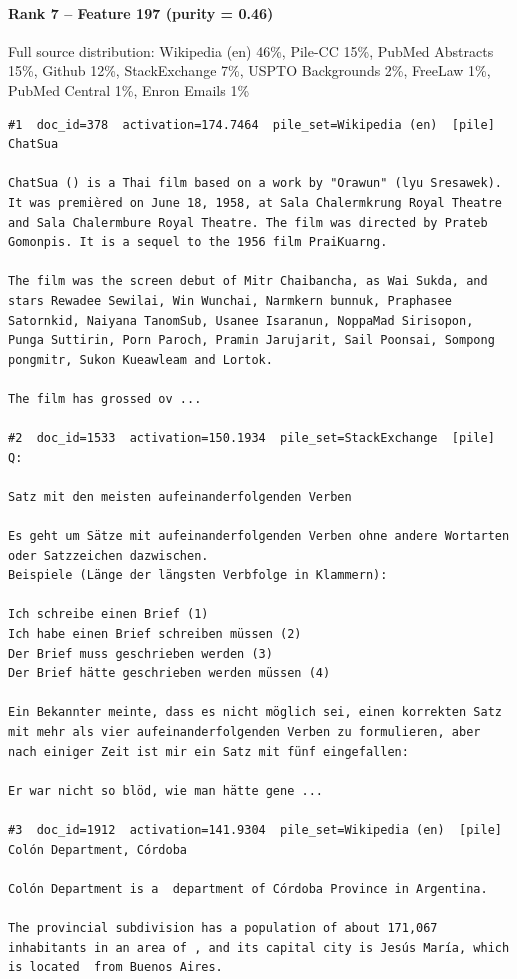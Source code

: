 \paragraph*{Rank 7 -- Feature 197 (purity = 0.46)}

Full source distribution: Wikipedia (en) 46\%, Pile-CC 15\%, PubMed Abstracts 15\%, Github 12\%, StackExchange 7\%, USPTO Backgrounds 2\%, FreeLaw 1\%, PubMed Central 1\%, Enron Emails 1\%

\begin{verbatim}
#1  doc_id=378  activation=174.7464  pile_set=Wikipedia (en)  [pile]
ChatSua

ChatSua () is a Thai film based on a work by "Orawun" (lyu Sresawek). It was premièred on June 18, 1958, at Sala Chalermkrung Royal Theatre and Sala Chalermbure Royal Theatre. The film was directed by Prateb Gomonpis. It is a sequel to the 1956 film PraiKuarng.

The film was the screen debut of Mitr Chaibancha, as Wai Sukda, and stars Rewadee Sewilai, Win Wunchai, Narmkern bunnuk, Praphasee Satornkid, Naiyana TanomSub, Usanee Isaranun, NoppaMad Sirisopon, Punga Suttirin, Porn Paroch, Pramin Jarujarit, Sail Poonsai, Sompong pongmitr, Sukon Kueawleam and Lortok.

The film has grossed ov ...

#2  doc_id=1533  activation=150.1934  pile_set=StackExchange  [pile]
Q:

Satz mit den meisten aufeinanderfolgenden Verben

Es geht um Sätze mit aufeinanderfolgenden Verben ohne andere Wortarten oder Satzzeichen dazwischen.
Beispiele (Länge der längsten Verbfolge in Klammern):

Ich schreibe einen Brief (1)
Ich habe einen Brief schreiben müssen (2)
Der Brief muss geschrieben werden (3)
Der Brief hätte geschrieben werden müssen (4)

Ein Bekannter meinte, dass es nicht möglich sei, einen korrekten Satz mit mehr als vier aufeinanderfolgenden Verben zu formulieren, aber nach einiger Zeit ist mir ein Satz mit fünf eingefallen:

Er war nicht so blöd, wie man hätte gene ...

#3  doc_id=1912  activation=141.9304  pile_set=Wikipedia (en)  [pile]
Colón Department, Córdoba

Colón Department is a  department of Córdoba Province in Argentina.

The provincial subdivision has a population of about 171,067 inhabitants in an area of , and its capital city is Jesús María, which is located  from Buenos Aires.


\end{verbatim}
